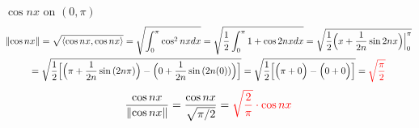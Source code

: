 \item [1.] $\cos{nx}$ on $(0,\pi)$\vspace{-5mm}
\begin{gather*}
    \left \lVert \cos{nx} \right \rVert 
    = \sqrt{\langle \cos{nx}, \cos{nx} \rangle}
    = \sqrt{\int_0^\pi \cos^2{nx}dx}
    = \sqrt{\frac{1}{2}\int_0^\pi 1+\cos{2nx}dx}
    = \sqrt{\frac{1}{2} \Big(x+\frac{1}{2n}\sin{2nx}\Big)\Big|_0^\pi}\\
    = \sqrt{\frac{1}{2} 
    \Big[
    \Big(\pi+\frac{1}{2n}\sin{(2n\pi)}\Big)
    -
    \Big(0+\frac{1}{2n}\sin{(2n(0))}\Big)
    \Big]
    }
    = \sqrt{\frac{1}{2} 
    \Big[
    \Big(\pi+0\Big)
    -
    \Big(0+0\Big)
    \Big]
    }
    = \textcolor{red}{\sqrt{\frac{\pi}{2}}}
\end{gather*}
\begin{gather*}
    \frac{\cos{nx}}{\left \lVert \cos{nx} \right \rVert} 
    = \frac{\cos{nx}}{\sqrt{\pi/2}}
    = \textcolor{red}{\sqrt{\frac{2}{\pi}}\cdot\cos{nx}}
\end{gather*}
